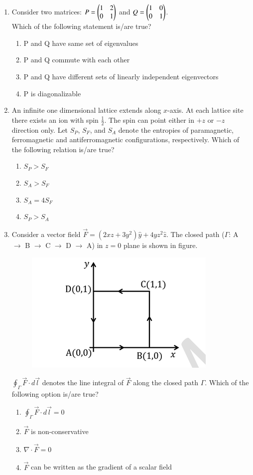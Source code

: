 \documentclass[journal,12pt,onecolumn]{IEEEtran}
\theoremstyle{remark}
\begin{document}
\begin{enumerate}
\item Consider two matrices: $P = \begin{pmatrix}1 & 2 \\ 0 & 1\end{pmatrix} $ and $Q = \begin{pmatrix} 1 & 0 \\ 0 & 1 \end{pmatrix}$.\\
Which of the following statement is/are true?
\begin{enumerate}
    \item P and Q have same set of eigenvalues
    \item P and Q commute with each other
    \item P and Q have different sets of linearly independent eigenvectors
    \item P is diagonalizable
\end{enumerate}
\item An infinite one dimensional lattice extends along $x$-axis. At each lattice site there exists an ion with spin $\frac{1}{2}$. The spin can point either in $+z$ or $-z$ direction only. Let $S_P$, $S_F$, and $S_A$ denote the entropies of paramagnetic, ferromagnetic and antiferromagnetic configurations, respectively. Which of the following relation is/are true?
\begin{enumerate}
    \item $S_P > S_F$
    \item $S_A > S_F$
    \item $S_A = 4 S_F$
    \item $S_P > S_A$
\end{enumerate}

\item Consider a vector field $\vec{F} = (2xz + 3y^2)\hat{y} + 4yz^2 \hat{z}$. The closed path ($\Gamma$: A $\to$ B $\to$ C $\to$ D $\to$ A) in $z=0$ plane is shown in figure.
\begin{figure}[H]
    \centering
    \includegraphics[width = 0.5\columnwidth]{fig/Q45.png}
    \caption*{}
    \label{fig: Q45}
\end{figure}
$\oint_\Gamma \vec{F}\cdot d\vec{l}$ denotes the line integral of $\vec{F}$ along the closed path $\Gamma$. Which of the following option is/are true?
\begin{enumerate}
    \item $ \oint_\Gamma \vec{F}\cdot d\vec{l} = 0$
    \item $\vec{F}$ is non-conservative
    \item $\nabla \cdot \vec{F} = 0$
    \item $\vec{F}$ can be written as the gradient of a scalar field
\end{enumerate}


\end{enumerate}
\end{document}

